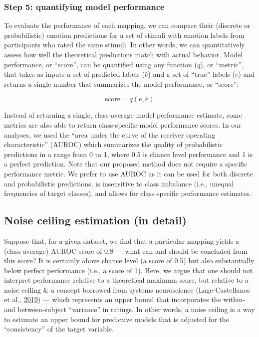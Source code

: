 \documentclass[12pt,american,a4paper,oneside,]{memoir} %
\begin{document}
\hypertarget{step-5-quantifying-model-performance}{%
\subsubsection{Step 5: quantifying model performance}\label{step-5-quantifying-model-performance}}

To evaluate the performance of each mapping, we can compare their (discrete or probabilistic) emotion predictions for a set of stimuli with emotion labels from participants who rated the same stimuli. In other words, we can quantitatively assess how well the theoretical predictions match with actual behavior. Model performance, or ``score'', can be quantified using any function (\(q\)), or ``metric'', that takes as inputs a set of predicted labels (\(\hat{e}\)) and a set of ``true'' labels (\(e\)) and returns a single number that summarizes the model performance, or ``score'':

\begin{equation}
\mathrm{score} = q(e, \hat{e})
\end{equation}

Instead of returning a single, class-average model performance estimate, some metrics are also able to return class-specific model performance scores. In our analyses, we used the ``area under the curve of the receiver operating characteristic'' (AUROC) which summarizes the quality of probabilistic predictions in a range from 0 to 1, where 0.5 is chance level performance and 1 is a perfect prediction. Note that our proposed method does not require a specific performance metric. We prefer to use AUROC as it can be used for both discrete and probabilistic predictions, is insensitive to class imbalance (i.e., unequal frequencies of target classes), and allows for class-specific performance estimates.

\hypertarget{hka-noise-ceiling-detail}{%
\subsection{Noise ceiling estimation (in detail)}\label{hka-noise-ceiling-detail}}

Suppose that, for a given dataset, we find that a particular mapping yields a (class-average) AUROC score of 0.8 --- what can and should be concluded from this score? It is certainly above chance level (a score of 0.5) but also substantially below perfect performance (i.e., a score of 1). Here, we argue that one should not interpret performance relative to a theoretical maximum score, but relative to a noise ceiling \& a concept borrowed from systems neuroscience (Lage-Castellanos et al., \protect\hyperlink{ref-lage2019methods}{2019}) --- which represents an upper bound that incorporates the within- and between-subject ``variance'' in ratings. In other words, a noise ceiling is a way to estimate an upper bound for predictive models that is adjusted for the ``consistency'' of the target variable.
\end{document}
